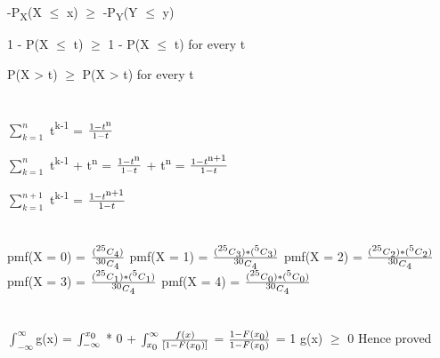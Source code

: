 \documentclass{report}
\begin{document}
{	-P{\textsubscript{X}}(X {$\le$} x) {$\ge$} -P{\textsubscript{Y}}(Y {$\le$} y) 
	
	1 - P(X {$\le$} t) {$\ge$} 1 - P(X {$\le$} t) for every t
	
	
	P(X > t) {$\ge$} P(X > t) for every t
	
	\section{}
	{$\sum_{k=1}^{n}$} t{\textsuperscript{k-1}} = {$\frac{1 - t{\textsuperscript{n}}}{1 - t}$}
	
	{$\sum_{k=1}^{n}$} t{\textsuperscript{k-1}} + t{\textsuperscript{n}} = {$\frac{1 - t{\textsuperscript{n}}}{1 - t}$} + t{\textsuperscript{n}} = {$\frac{1 - t{\textsuperscript{n+1}}}{1 - t}$}
	{\newline}
	
	{$\sum_{k=1}^{n+1}$} t{\textsuperscript{k-1}} = {$\frac{1 - t{\textsuperscript{n+1}}}{1 - t}$}
	
	\section{}
	pmf(X = 0) = {$\frac{({\textsuperscript{25}C{\textsubscript{4}}})}{{\textsuperscript{30}C{\textsubscript{4}}}}$}
	{\newline}
	pmf(X = 1) = {$\frac{({\textsuperscript{25}C{\textsubscript{3}}}) * ({\textsuperscript{5}C{\textsubscript{3}}})}{{\textsuperscript{30}C{\textsubscript{4}}}}$}
	{\newline}
	pmf(X = 2) = {$\frac{({\textsuperscript{25}C{\textsubscript{2}}}) * ({\textsuperscript{5}C{\textsubscript{2}}})}{{\textsuperscript{30}C{\textsubscript{4}}}}$}
	{\newline}
	pmf(X = 3) = {$\frac{({\textsuperscript{25}C{\textsubscript{1}}}) * ({\textsuperscript{5}C{\textsubscript{1}}})}{{\textsuperscript{30}C{\textsubscript{4}}}}$}
	{\newline}
	pmf(X = 4) = {$\frac{({\textsuperscript{25}C{\textsubscript{0}}}) * ({\textsuperscript{5}C{\textsubscript{0}}})}{{\textsuperscript{30}C{\textsubscript{4}}}}$}
	{\newline}
	
	\section{}
	{$\int_{-{\infty}}^{{\infty}}$}g(x) = {$\int_{-{\infty}}^{x{\textsubscript{0}}}$} * 0 + {$\int_{x{\textsubscript{0}}}^{{\infty}}$}{$\frac{f(x)}{[1 - F(x{\textsubscript{0}})]}$} = {$\frac{1 - F(x{\textsubscript{0}})}{1 - F(x{\textsubscript{0}})}$} = 1 g(x) {$\ge$} 0 Hence proved
	
}
\end{document}
